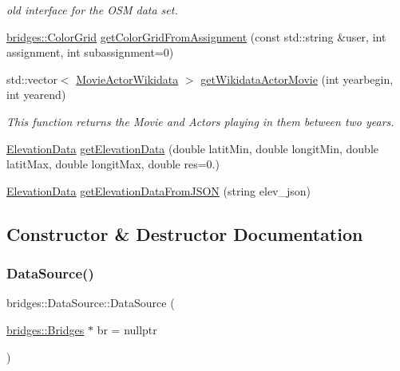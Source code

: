 \begin{DoxyCompactItemize}
\begin{DoxyCompactList}\small\item\em old interface for the O\+SM data set. \end{DoxyCompactList}\item 
\hyperlink{classbridges_1_1datastructure_1_1_color_grid}{bridges\+::\+Color\+Grid} \hyperlink{classbridges_1_1_data_source_aa65136879011e1ec237380ef8587fea2}{get\+Color\+Grid\+From\+Assignment} (const std\+::string \&user, int assignment, int subassignment=0)
\item 
std\+::vector$<$ \hyperlink{classbridges_1_1dataset_1_1_movie_actor_wikidata}{Movie\+Actor\+Wikidata} $>$ \hyperlink{classbridges_1_1_data_source_a25b33736b4ae9ffea5fe4ebf5dbb3a63}{get\+Wikidata\+Actor\+Movie} (int yearbegin, int yearend)
\begin{DoxyCompactList}\small\item\em This function returns the Movie and Actors playing in them between two years. \end{DoxyCompactList}\item 
\hyperlink{classbridges_1_1dataset_1_1_elevation_data}{Elevation\+Data} \hyperlink{classbridges_1_1_data_source_a7fc5797c544d79f245ac49af1cc138a3}{get\+Elevation\+Data} (double latit\+Min, double longit\+Min, double latit\+Max, double longit\+Max, double res=0.)
\item 
\hyperlink{classbridges_1_1dataset_1_1_elevation_data}{Elevation\+Data} \hyperlink{classbridges_1_1_data_source_a59db809fd5ab69176f73134ebdb968d1}{get\+Elevation\+Data\+From\+J\+S\+ON} (string elev\+\_\+json)
\end{DoxyCompactItemize}


\subsection{Constructor \& Destructor Documentation}
\mbox{\label{classbridges_1_1_data_source_afc95b52d2ca03a92c1f1ee1594a097c7}} 
\subsubsection{\texorpdfstring{Data\+Source()}{DataSource()}\hspace{0.1cm}{\footnotesize\ttfamily [1/2]}}
{\footnotesize\ttfamily bridges\+::\+Data\+Source\+::\+Data\+Source (\begin{DoxyParamCaption}\item[{\hyperlink{classbridges_1_1_bridges}{bridges\+::\+Bridges} $\ast$}]{br = {\ttfamily nullptr} }\end{DoxyParamCaption})\hspace{0.3cm}{\ttfamily [inline]}}

